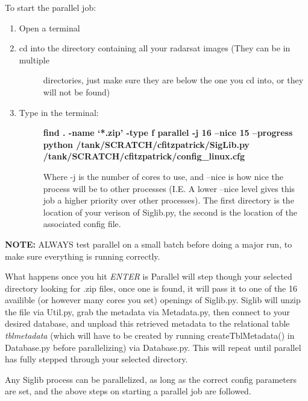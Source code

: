 \documentclass[letterpaper,10pt,openany,oneside]{sphinxmanual}
\begin{document}
To start the parallel job:
\begin{enumerate}
\item {} 
Open a terminal

\item {} \begin{description}
\item[{cd into the directory containing all your radarsat images (They can be in multiple}] \leavevmode
directories, just make sure they are below the one you cd into, or they will
not be found)

\end{description}

\item {} \begin{description}
\item[{Type in the terminal:}] \leavevmode
\textbf{find . -name `*.zip' -type f \textbar{} parallel -j 16 --nice 15 --progress python /tank/SCRATCH/cfitzpatrick/SigLib.py /tank/SCRATCH/cfitzpatrick/config\_linux.cfg}

Where -j is the number of cores to use, and --nice is how nice the process will be to
other processes (I.E. A lower --nice level gives this job a higher priority over
other processes). The first directory is the location of your verison of Siglib.py,
the second is the location of the associated config file.

\end{description}

\end{enumerate}

\textbf{NOTE:} ALWAYS test parallel on a small batch before doing a major run, to make
sure everything is running correctly.

What happens once you hit \emph{ENTER} is Parallel will step though your selected
directory looking for .zip files, once one is found, it will pass it to one of the
16 availible (or however many cores you set) openings of Siglib.py. Siglib will
unzip the file via Util.py, grab the metadata via Metadata.py, then connect to your
desired database, and unpload this retrieved metadata to the relational table
\emph{tblmetadata} (which will have to be created by running createTblMetadata() in
Database.py before parallelizing) via Database.py. This will repeat until parallel has
fully stepped through your selected directory.

Any Siglib process can be parallelized, as long as the correct config parameters
are set, and the above steps on starting a parallel job are followed.
\end{document}
